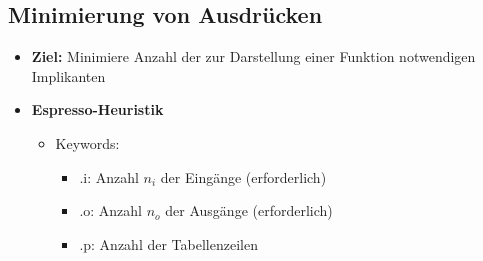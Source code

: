 \pagebreak

\subsection{Minimierung von Ausdrücken}
\begin{itemize}

\item \textbf{Ziel:} Minimiere Anzahl der zur Darstellung einer Funktion notwendigen Implikanten

\item \textbf{Espresso-Heuristik}
	\begin{itemize}
	
	\item Keywords:
		\begin{itemize}
		\item .i: Anzahl $n_i$ der Eingänge (erforderlich)
		\item .o: Anzahl $n_o$ der Ausgänge (erforderlich)
		\item .p: Anzahl der Tabellenzeilen
		\end{itemize}
	
	\end{itemize}

\end{itemize}

